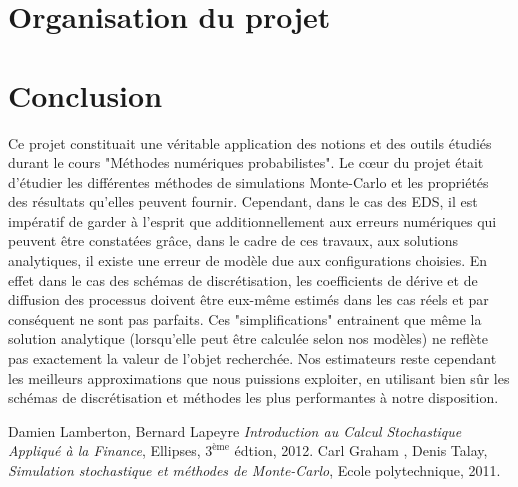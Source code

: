 \documentclass[a4paper,10pt]{article}
\begin{document}
\newpage
\tableofcontents 
\newpage
\section{Organisation du projet}


%
%



\clearpage
\newpage
{}
\section*{Conclusion}

Ce projet constituait une véritable application des notions et des outils étudiés durant le cours "Méthodes numériques probabilistes".
Le cœur du projet était d'étudier les différentes méthodes de simulations Monte-Carlo et les propriétés des résultats qu'elles peuvent fournir. Cependant, dans le cas des EDS, il est impératif de garder à l'esprit que additionnellement aux erreurs numériques qui peuvent être constatées grâce, dans le cadre de ces travaux, aux solutions analytiques, il existe une erreur de modèle due aux configurations choisies. En effet dans le cas des schémas de discrétisation, les coefficients de dérive et de diffusion des processus doivent être eux-même estimés dans les cas réels et par conséquent ne sont pas parfaits. 
Ces "simplifications" entrainent que même la solution analytique (lorsqu'elle peut être calculée selon nos modèles) ne reflète pas exactement la valeur de l'objet recherchée. Nos estimateurs reste cependant les meilleurs approximations que nous puissions exploiter, en utilisant bien sûr les schémas de discrétisation et méthodes les plus performantes à notre disposition. 
  
\clearpage
\newpage
{}
\begin{thebibliography}{9}
 Damien Lamberton, Bernard Lapeyre {\em Introduction au Calcul Stochastique Appliqué à la Finance}, Ellipses, $3^{\text{ème}}$ édtion, 2012.
 Carl Graham , Denis Talay, {\em Simulation stochastique et méthodes de Monte-Carlo}, Ecole polytechnique, 2011.


\end{thebibliography}
\end{document}
